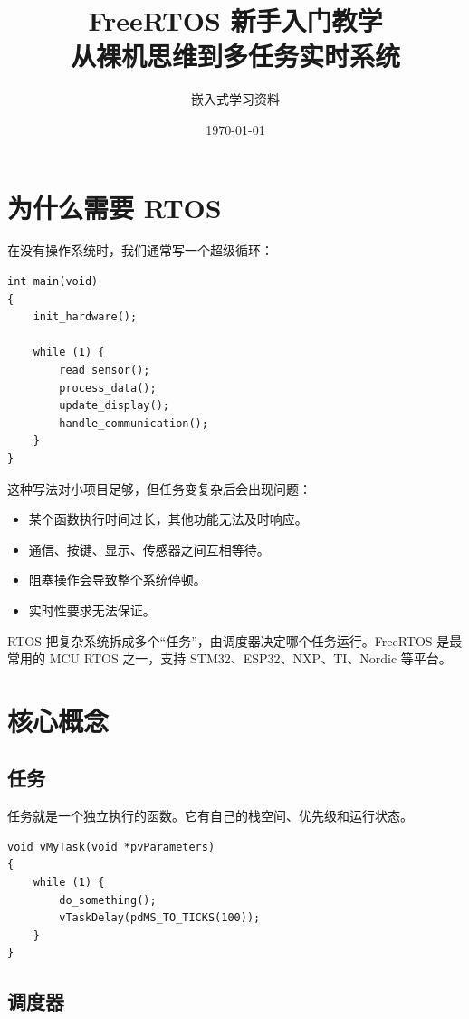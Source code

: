 \documentclass[12pt,a4paper]{ctexart}
\title{\textbf{FreeRTOS 新手入门教学}\\[0.3em]
\large 从裸机思维到多任务实时系统}
\author{嵌入式学习资料}
\date{\today}
\begin{document}
\maketitle

\tableofcontents
\newpage

\section{为什么需要 RTOS}

在没有操作系统时，我们通常写一个超级循环：

\begin{lstlisting}
int main(void)
{
    init_hardware();

    while (1) {
        read_sensor();
        process_data();
        update_display();
        handle_communication();
    }
}
\end{lstlisting}

这种写法对小项目足够，但任务变复杂后会出现问题：

\begin{itemize}
    \item 某个函数执行时间过长，其他功能无法及时响应。
    \item 通信、按键、显示、传感器之间互相等待。
    \item 阻塞操作会导致整个系统停顿。
    \item 实时性要求无法保证。
\end{itemize}

RTOS 把复杂系统拆成多个“任务”，由调度器决定哪个任务运行。FreeRTOS 是最常用的 MCU RTOS 之一，支持 STM32、ESP32、NXP、TI、Nordic 等平台。

\section{核心概念}

\subsection{任务}

任务就是一个独立执行的函数。它有自己的栈空间、优先级和运行状态。

\begin{lstlisting}
void vMyTask(void *pvParameters)
{
    while (1) {
        do_something();
        vTaskDelay(pdMS_TO_TICKS(100));
    }
}
\end{lstlisting}

\subsection{调度器}
\end{document}
